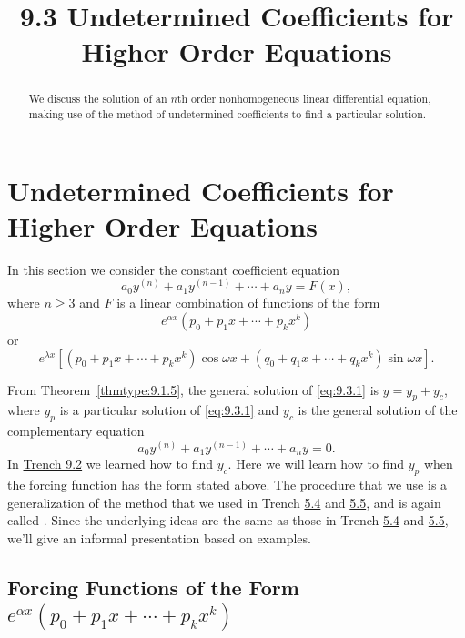 \documentclass{ximera}
\title{9.3 Undetermined Coefficients for Higher Order Equations}%
\begin{document}
\begin{abstract}
We discuss the solution of an $n$th order nonhomogeneous linear differential equation, making use of the method of undetermined coefficients to find a particular solution.
\end{abstract}

\maketitle

\section*{Undetermined Coefficients for Higher Order Equations}

In this section we consider the constant coefficient equation
\begin{equation}
 \label{eq:9.3.1} a_0y^{(n)}+a_1y^{(n-1)}+\cdots+a_ny=F(x),
\end{equation}
where $n\geq 3$ and $F$ is a linear combination of
functions of the form
$$
e^{\alpha x}\left(p_0+p_1x+\cdots+p_kx^k\right)
$$
or
$$
e^{\lambda x}\left[\left(p_0+p_1x+\cdots+p_kx^k\right)
\cos\omega x+
\left(q_0+q_1x+\cdots+q_kx^k\right)
\sin\omega x\right].
$$

From Theorem~\ref{thmtype:9.1.5}, the general solution of \eqref{eq:9.3.1} is
$y=y_p+y_c$, where $y_p$ is a particular solution of \eqref{eq:9.3.1} and
$y_c$ is the general solution of the complementary equation
$$
a_0y^{(n)}+a_1y^{(n-1)}+\cdots+a_ny=0.
$$
In \href{https://ximera.osu.edu/ode/main/higherOrderConstCoeff/higherOrderConstCoeff}{Trench 9.2} we learned how to find $y_c$. Here
we
will learn how to find $y_p$ when the forcing function has the form stated
above. The procedure that we  use is a generalization of the
method that we used in Trench \href{https://ximera.osu.edu/ode/main/undeterminedCoeff/undeterminedCoeff}{5.4} and
\href{https://ximera.osu.edu/ode/main/undeterminedCoeff2/undeterminedCoeff2}{5.5}, and is again called
. Since
the underlying ideas are the same as those in
Trench \href{https://ximera.osu.edu/ode/main/undeterminedCoeff/undeterminedCoeff}{5.4} and
\href{https://ximera.osu.edu/ode/main/undeterminedCoeff2/undeterminedCoeff2}{5.5},
we'll give  an informal presentation based on
examples.

\subsection*{Forcing Functions of the Form
$e^{\alpha x}\left(p_0+p_1x+\cdots+p_kx^k\right)$}
\end{document}
